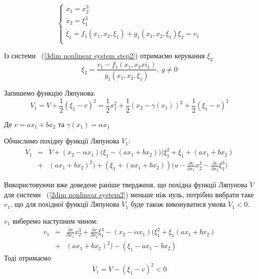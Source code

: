 \documentclass{article}
\begin{document}
\begin{equation} \label{3dim nonlinear system step2}
    \begin{cases}
        \dot x_1 = x_2^3 \\
        \dot x_2 = \xi_1^3\\
        \dot \xi_1 =f_1(x_1,x_2,\xi_1)+g_1(x_1,x_2,\xi_1)\xi_2 = v_1\\
        \end{cases}
\end{equation}

Із системи ~(\ref{3dim nonlinear system step2}) отримаємо керування $\xi_2$ 
\begin{equation}
    \xi_2 = \frac{v_1-f_1(x_1,x_2xi_1)}{g_1(x_1,x_2,\xi_{1})}, ~g \neq 0
\end{equation}

Запишемо функцію Ляпунова:
\begin{equation}
    V_1 = V+\frac{1}{2}(\xi_1-v)^2=\frac{1}{2}x_1^2+\frac{1}{2}(x_2-\gamma(x_1))^2+
    \frac{1}{2}(\xi_1-v)^2
\end{equation}

Де $v = ax_1+bx_2$ та $\gamma(x_1) = \alpha x_1$

Обчислимо похідну функції Ляпунова $V_1$:
\begin{eqnarray}
    \dot V_1 &=& \dot V + (x_2-\alpha x_1) \Big( \xi_1-(ax_1+bx_2) \Big)
    \Big( \xi_1^2+\xi_1+(ax_1+bx_2) \nonumber \\ &+&(ax_1+bx_2)^2 \Big)
    +(\xi_1+(ax_1+bx_2))
    \Big(u-\frac{\partial v}{\partial x_1}x_{2}^3 
    - \frac{\partial v}{\partial x_2}\xi_{1}^3 \Big)
\end{eqnarray}

Використовуючи вже доведене раніше твердженя, що похідна функції Ляпунова $\dot V$ для системи
 ~(\ref{2dim nonlinear system2})  меньше ніж нуль, потрібно вибрати таке $v_1$, що для похідної функції
Ляпунова $\dot V_1$ буде також виконуватися умова $\dot V_1 < 0$.

$v_1$ виберемо наступним чином:
\begin{eqnarray}
    v_1 &=& \frac{\partial v}{\partial x_1}x_{2}^3 + \frac{\partial v}{\partial x_2}\xi_{1}^3
    - (x_2 -\alpha x_1) \Big(\xi_1^2 + \xi_1(ax_1 + bx_2) \nonumber \\ 
    &+& (ax_1+bx_2)^2 \Big) -(\xi_1 - ax_1-bx_2)
\end{eqnarray}
Тоді отримаємо
\begin{equation}
    \dot V_1 = \dot V - (\xi_1 - v)^2<0
\end{equation}
\end{document}
